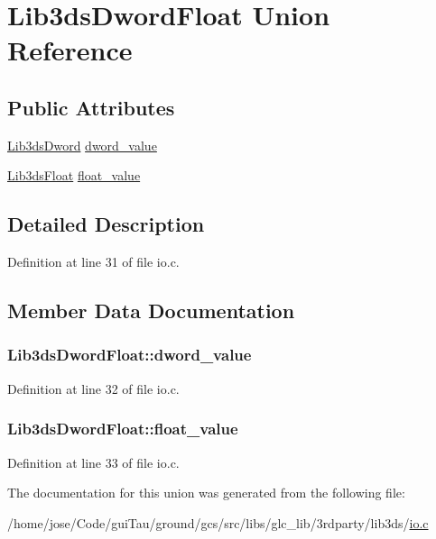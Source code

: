 \hypertarget{union_lib3ds_dword_float}{\section{Lib3ds\-Dword\-Float Union Reference}
\label{union_lib3ds_dword_float}
}
\subsection*{Public Attributes}
\begin{DoxyCompactItemize}
\item 
\hyperlink{types_8h_a299c9663303144c562f6bd92c2f273d3}{Lib3ds\-Dword} \hyperlink{union_lib3ds_dword_float_a4f44f14b4fd141147312682963c96ca4}{dword\-\_\-value}
\item 
\hyperlink{types_8h_ab18e70f51f9a53c9dee8d930c8e1a7bf}{Lib3ds\-Float} \hyperlink{union_lib3ds_dword_float_ac072d30c9f41f81e3175a2336c817674}{float\-\_\-value}
\end{DoxyCompactItemize}


\subsection{Detailed Description}


Definition at line 31 of file io.\-c.



\subsection{Member Data Documentation}
\hypertarget{union_lib3ds_dword_float_a4f44f14b4fd141147312682963c96ca4}{
\subsubsection[{dword\-\_\-value}]{ Lib3ds\-Dword\-Float\-::dword\-\_\-value}}\label{union_lib3ds_dword_float_a4f44f14b4fd141147312682963c96ca4}


Definition at line 32 of file io.\-c.

\hypertarget{union_lib3ds_dword_float_ac072d30c9f41f81e3175a2336c817674}{
\subsubsection[{float\-\_\-value}]{ Lib3ds\-Dword\-Float\-::float\-\_\-value}}\label{union_lib3ds_dword_float_ac072d30c9f41f81e3175a2336c817674}


Definition at line 33 of file io.\-c.



The documentation for this union was generated from the following file\-:\begin{DoxyCompactItemize}
\item 
/home/jose/\-Code/gui\-Tau/ground/gcs/src/libs/glc\-\_\-lib/3rdparty/lib3ds/\hyperlink{io_8c}{io.\-c}\end{DoxyCompactItemize}
